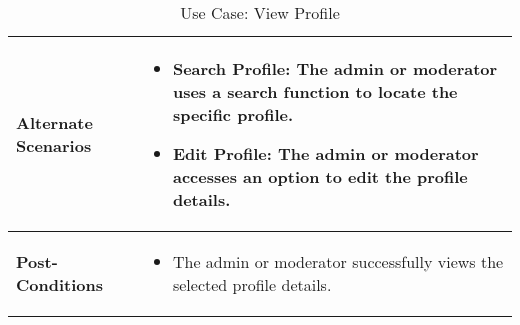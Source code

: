 \begin{table}[!ht]
\begin{tabularx}{\textwidth}{|l|X|}
        \hline
        \textbf{Alternate Scenarios} & 
        \begin{itemize}[label=--,itemsep=0pt]
            \item Search Profile: The admin or moderator uses a search function to locate the specific profile.
            \item Edit Profile: The admin or moderator accesses an option to edit the profile details.
        \end{itemize} \\
        \hline
        \textbf{Post-Conditions} & 
        \begin{itemize}[label=--,itemsep=0pt]
            \item The admin or moderator successfully views the selected profile details.
        \end{itemize} \\
        \hline
    \end{tabularx}
    \caption{Use Case: View Profile}
    \label{tab:use-case-view-profile}
\end{table}


